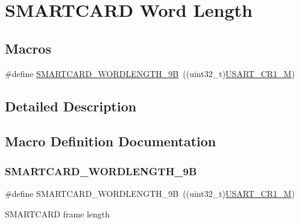 \hypertarget{group___s_m_a_r_t_c_a_r_d___word___length}{}\section{S\+M\+A\+R\+T\+C\+A\+RD Word Length}
\label{group___s_m_a_r_t_c_a_r_d___word___length}
\subsection*{Macros}
\begin{DoxyCompactItemize}
\item 
\#define \hyperlink{group___s_m_a_r_t_c_a_r_d___word___length_ga22f73d114cf13ee0041537303faef14b}{S\+M\+A\+R\+T\+C\+A\+R\+D\+\_\+\+W\+O\+R\+D\+L\+E\+N\+G\+T\+H\+\_\+9B}~((uint32\+\_\+t)\hyperlink{group___peripheral___registers___bits___definition_ga95f0288b9c6aaeca7cb6550a2e6833e2}{U\+S\+A\+R\+T\+\_\+\+C\+R1\+\_\+M})
\end{DoxyCompactItemize}


\subsection{Detailed Description}


\subsection{Macro Definition Documentation}
\mbox{\label{group___s_m_a_r_t_c_a_r_d___word___length_ga22f73d114cf13ee0041537303faef14b}} 
\subsubsection{\texorpdfstring{S\+M\+A\+R\+T\+C\+A\+R\+D\+\_\+\+W\+O\+R\+D\+L\+E\+N\+G\+T\+H\+\_\+9B}{SMARTCARD\_WORDLENGTH\_9B}}
{\footnotesize\ttfamily \#define S\+M\+A\+R\+T\+C\+A\+R\+D\+\_\+\+W\+O\+R\+D\+L\+E\+N\+G\+T\+H\+\_\+9B~((uint32\+\_\+t)\hyperlink{group___peripheral___registers___bits___definition_ga95f0288b9c6aaeca7cb6550a2e6833e2}{U\+S\+A\+R\+T\+\_\+\+C\+R1\+\_\+M})}

S\+M\+A\+R\+T\+C\+A\+RD frame length 